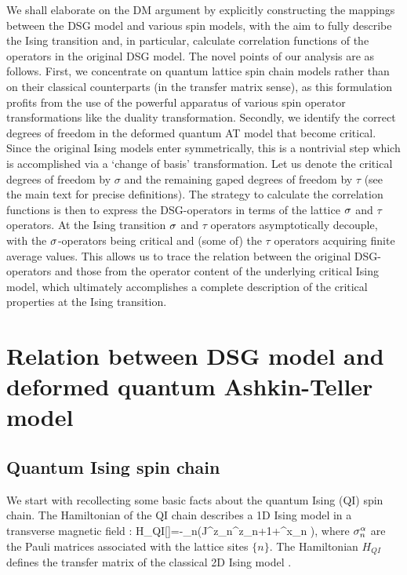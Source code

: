 We shall elaborate on the DM argument
by explicitly constructing the mappings between the
DSG model and various spin models, with the aim to
fully describe the Ising transition and, in particular,
calculate correlation functions
of the operators in the original DSG model.
The novel points of our analysis are as follows.
First, we concentrate on quantum lattice spin chain
models
rather than on their classical counterparts
(in the transfer matrix sense), as this formulation
profits from the use of the powerful apparatus
of various spin operator transformations like
the duality transformation. 
Secondly, we identify the correct degrees of freedom in
the deformed quantum AT model 
that become critical. 
Since the original Ising models enter symmetrically,
this is a nontrivial step 
which is accomplished via a `change of basis' 
transformation. Let us denote the critical degrees of freedom by
$\sigma$ and the remaining gaped degrees of freedom
by $\tau$ (see the main text for precise definitions).
The strategy to calculate the correlation functions
is then to express the DSG-operators in terms of 
the lattice $\sigma$ and $\tau$ operators. At the Ising transition
$\sigma$ and $\tau$ operators asymptotically decouple, 
with the $\sigma$-operators being critical and (some of) 
the $\tau$ operators acquiring finite average values. 
This allows us to trace the relation
between the original DSG-operators and those 
from the operator content of the underlying
critical Ising model, which ultimately accomplishes a
complete description of the critical properties at the
Ising transition.



\section{Relation between DSG model and deformed quantum Ashkin-Teller
model}

\subsection{Quantum Ising spin chain}

We start with recollecting some basic facts about the
quantum Ising (QI) spin chain. The Hamiltonian of the QI chain
describes a 1D Ising model in a transverse magnetic
field \cite{Pf}:
\be
H_{QI}[\sigma]=-\sum_n\left(J\s^z_n\s^z_{n+1}+\Delta \s^x_n
\right),
\label{QI}
\ee
where $\sigma^{\alpha}_n$ are the Pauli matrices associated with the lattice sites
$\{n \}$. The Hamiltonian $H_{QI}$ defines the transfer
matrix of the classical 2D Ising model 
\cite{LSM}.

